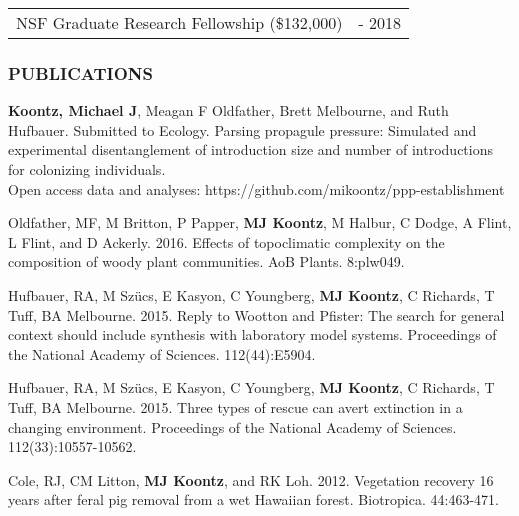 \documentclass[11pt,english]{article}
\begin{document}
\begin{tabular}{>{\raggedright}p{5in}>{\raggedleft}p{1in}}
NSF Graduate Research Fellowship (\$132,000) & 2013 - 2018
\end{tabular}



\vspace{1.5ex}
\subsubsection*{PUBLICATIONS}
\vspace{-0.5ex}

\begin{hangparas}{.5in}{1}

\hspace{0.575em}\textbf{Koontz, Michael J}, Meagan F Oldfather, Brett Melbourne, and Ruth Hufbauer. Submitted to Ecology. Parsing propagule pressure: Simulated and experimental disentanglement of introduction size and number of introductions for colonizing individuals. \\
Open access data and analyses: https://github.com/mikoontz/ppp-establishment

\hspace{0.575em}Oldfather, MF, M Britton, P Papper, \textbf{MJ Koontz}, M Halbur, C Dodge, A Flint, L Flint, and D Ackerly. 2016. Effects of topoclimatic complexity on the composition of woody plant communities. AoB Plants. 8:plw049.

\hspace{0.575em}Hufbauer, RA, M Sz\"ucs, E Kasyon, C Youngberg, \textbf{MJ Koontz}, C Richards, T Tuff, BA Melbourne. 2015. Reply to Wootton and Pfister: The search for general context should include synthesis with laboratory model systems. Proceedings of the National Academy of Sciences. 112(44):E5904.

\hspace{0.575em}Hufbauer, RA, M Sz\"ucs, E Kasyon, C Youngberg, \textbf{MJ Koontz}, C Richards, T Tuff, BA Melbourne. 2015. Three types of rescue can avert extinction in a changing environment. Proceedings of the National Academy of Sciences. 112(33):10557-10562.

\hspace{0.575em}Cole, RJ, CM Litton, \textbf{MJ Koontz}, and RK
Loh. 2012. Vegetation recovery 16 years after feral pig removal from
a wet Hawaiian forest. Biotropica. 44:463-471.

\end{hangparas}
\vspace{1ex}
\end{document}
